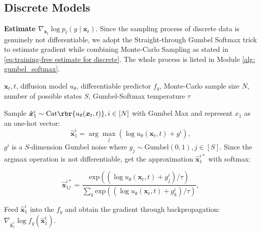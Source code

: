 \subsection{Discrete Models}
\label{appendix:imp_discret}

\textbf{Estimate $\nabla_{\boldsymbol{x}_t} \log p_t(y\mid \boldsymbol{x}_t)$}. Since the sampling process of discrete data is genuinely not differentiable, we adopt the Straight-through Gumbel Softmax trick to estimate gradient while combining Monte-Carlo Sampling as stated in \cref{eq:training-free estimate for discrete}. The whole process is listed in Module \ref{alg: gumbel_softmax}.


\begin{module}[htb]
\begin{algorithmic}[1]
 $\boldsymbol{x}_t, t$, diffusion model $u_\theta$, differentiable predictor $f_y$, Monte-Carlo sample size $N$, number of possible states $S$, Gumbel-Softmax temperature $\tau$

\STATE Sample $\hat{\boldsymbol{x}}_1^i\sim\text{Cat}\rbr{u_\theta( \boldsymbol{x}_{t}, t)}, i \in [N]$ with Gumbel Max and represent $x_1$ as an one-hot vector:  
\begin{equation}
    \hat{\boldsymbol{x}}_1^i=\arg\max_{j} (\log u_\theta( \boldsymbol{x}_{t}, t) + g^i),
\end{equation}
$g^i$ is a $S$-dimension Gumbel noise where $g_j \sim {\displaystyle {\text{Gumbel}}(0,1)}, j \in [S]$.
\STATE Since the argmax operation is not differentiable, get the approximation
$\hat{\boldsymbol{x}}_1^{i*}$ with softmax:

\begin{equation}
    \hat{\boldsymbol{x}}_{1j}^{i*}=\frac{\mathrm{exp}((\log u_\theta( \boldsymbol{x}_{t}, t) + g^i_j)/\tau)}{\sum_k \mathrm{exp}((\log u_\theta( \boldsymbol{x}_{t}, t) + g^i_k)/\tau) },
    \label{eq:gumbel_softmax}
\end{equation}

\STATE Feed $\hat{\boldsymbol{x}}_1^i$ into the $f_y$ and obtain the gradient through backpropagation:
 $\nabla_{\hat{\boldsymbol{x}}_1^i} \log f_y( \hat{\boldsymbol{x}}_1^i)$.


\end{algorithmic}
\end{module}

